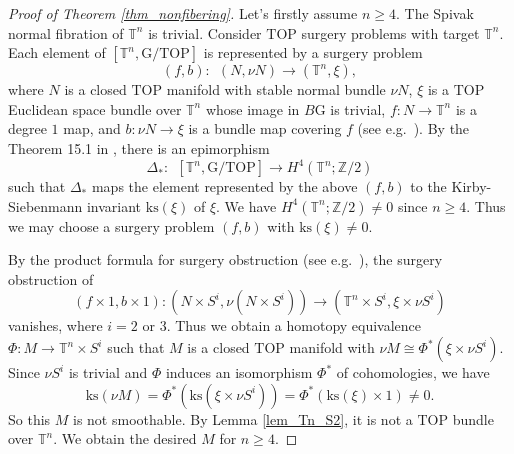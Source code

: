 \documentclass[12pt]{amsart}
\theoremstyle{plain}
\theoremstyle{definition}
\theoremstyle{question}
\theoremstyle{remark}
\theoremstyle{assumption}
\numberwithin{equation}{section}
\theoremstyle{bigthm}
\begin{document}
\begin{proof}[Proof of Theorem \ref{thm_nonfibering}]
Let's firstly assume $n \ge 4$. The Spivak normal fibration of $\mathbb{T}^{n}$ is trivial. Consider $\mathrm{TOP}$ surgery problems with target $\mathbb{T}^{n}$. Each element of $[\mathbb{T}^{n}, \mathrm{G}/ \mathrm{TOP}]$ is represented by a surgery problem
\[
(f,b) \colon  \ \ (N, \nu N) \rightarrow (\mathbb{T}^{n}, \xi),
\]
where $N$ is a closed $\mathrm{TOP}$ manifold with stable normal bundle $\nu N$, $\xi$ is a $\mathrm{TOP}$ Euclidean space bundle over $\mathbb{T}^{n}$ whose image in $B \mathrm{G}$ is trivial, $f \colon  N \rightarrow \mathbb{T}^{n}$ is a degree $1$ map, and $b \colon  \nu N \rightarrow \xi$ is a bundle map covering $f$ (see e.g.~\cite[Proposition~9.43]{Ranicki}). By the Theorem 15.1 in \cite[p.~328]{Kirby_Siebenmann}, there is an epimorphism
\[
\Delta_{*} \colon  \ \ [\mathbb{T}^{n}, \mathrm{G}/ \mathrm{TOP}] \rightarrow H^{4} (\mathbb{T}^{n}; \mathbb{Z}/2)
\]
such that $\Delta_{*}$ maps the element represented by the above $(f,b)$ to the Kirby-Siebenmann invariant $\mathrm{ks} (\xi)$ of $\xi$. We have $H^{4} (\mathbb{T}^{n}; \mathbb{Z}/2) \ne 0$ since $n \ge 4$. Thus we may choose a surgery problem $(f,b)$ with $\mathrm{ks} (\xi) \ne 0$.

By the product formula for surgery obstruction (see e.g.~\cite[Theorem IV.1.1]{Morgan}), the surgery obstruction of
\[
(f \times 1, b \times1) \colon  (N \times S^{i}, \nu (N \times S^{i})) \rightarrow (\mathbb{T}^{n} \times S^{i}, \xi \times \nu S^{i})
\]
vanishes, where $i=2$ or $3$. Thus we obtain a homotopy equivalence $\Phi \colon  M \rightarrow \mathbb{T}^{n} \times S^{i}$ such that $M$ is a closed $\mathrm{TOP}$ manifold with $\nu M \cong \Phi^{*} (\xi \times \nu S^{i})$. Since $\nu S^{i}$ is trivial and $\Phi$ induces an isomorphism $\Phi^{*}$ of cohomologies, we have
\[
\mathrm{ks} (\nu M) = \Phi^{*} (\mathrm{ks} (\xi \times \nu S^{i})) = \Phi^{*} (\mathrm{ks} (\xi) \times 1) \ne 0.
\]
So this $M$ is not smoothable. By Lemma \ref{lem_Tn_S2}, it is not a $\mathrm{TOP}$ bundle over $\mathbb{T}^{n}$. We obtain the desired $M$ for $n \ge 4$.


\end{proof}
\end{document}
